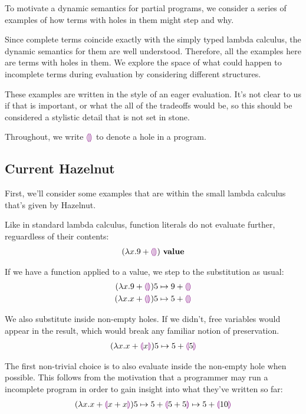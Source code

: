 To motivate a dynamic semantics for partial programs, we consider a series
of examples of how terms with holes in them might step and why.

Since complete terms coincide exactly with the simply typed lambda
calculus, the dynamic semantics for them are well understood. Therefore,
all the examples here are terms with holes in them. We explore the space of
what could happen to incomplete terms during evaluation by considering
different structures.

These examples are written in the style of an eager evaluation. It's not
clear to us if that is important, or what the all of the tradeoffs would
be, so this should be considered a stylistic detail that is not set in
stone.

Throughout, we write $\textcolor{violet}{\llparenthesis}\textcolor{violet}{\rrparenthesis}$ to denote a hole in a program.

\subsection{Current Hazelnut}
First, we'll consider some examples that are within the small lambda
calculus that's given by Hazelnut.

Like in standard lambda calculus, function literals do not
evaluate further, reguardless of their contents:
\begin{align*}
  {(\lambda x. 9 + \textcolor{violet}{\llparenthesis}\textcolor{violet}{\rrparenthesis})} ~\mathbf{value}
\end{align*}

If we have a function applied to a value, we step to the substitution as
usual:
\begin{align*}
  {
        (\lambda x.9 + \textcolor{violet}{\llparenthesis}\textcolor{violet}{\rrparenthesis})5
      } \mapsto {
        9 + \textcolor{violet}{\llparenthesis}\textcolor{violet}{\rrparenthesis}}
      \\
      {
        (\lambda x.x + \textcolor{violet}{\llparenthesis}\textcolor{violet}{\rrparenthesis})5
      } \mapsto {
        5 + \textcolor{violet}{\llparenthesis}\textcolor{violet}{\rrparenthesis}}
\end{align*}

We also substitute inside non-empty holes. If we didn't, free variables
would appear in the result, which would break any familiar notion of
preservation.
\begin{align*}
  {
        (\lambda x.x + \textcolor{violet}{\llparenthesis}x\textcolor{violet}{\rrparenthesis})5
      } \mapsto {
        5 + \textcolor{violet}{\llparenthesis}5\textcolor{violet}{\rrparenthesis}}
\end{align*}

The first non-trivial choice is to also evaluate inside the non-empty hole
when possible. This follows from the motivation that a programmer may run a
incomplete program in order to gain insight into what they've written so
far:
\begin{align*}
  {
    {
          (\lambda x.x + \textcolor{violet}{\llparenthesis}x + x\textcolor{violet}{\rrparenthesis})5
        } \mapsto {
          5 + \textcolor{violet}{\llparenthesis}5 + 5\textcolor{violet}{\rrparenthesis}}
  } \mapsto {5 + \textcolor{violet}{\llparenthesis}10\textcolor{violet}{\rrparenthesis}}
\end{align*}

